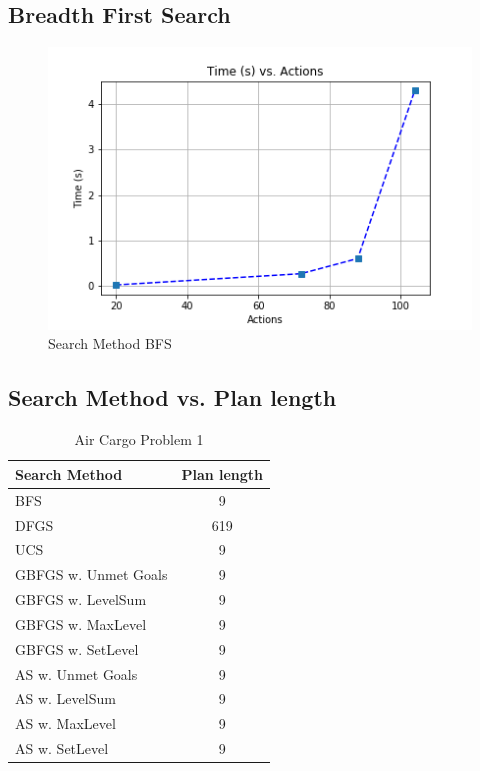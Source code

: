\documentclass[a4paper]{article}
\begin{document}
\subsection{Breadth First Search}

\begin{figure}[htpb]
\begin{center}
\includegraphics[width=0.5\columnwidth]{fig/results_1031.png}
\caption{Search Method BFS}
\end{center}
\label{fig1031}
\end{figure}

\subsection{Search Method vs. Plan length}

\begin{table}[htpb]
    \caption{ Air Cargo Problem 1 }
    \centering
    \begin{tabular}{ l | c }
    Search Method & Plan length \\ \hline 
BFS & 9 \\
DFGS & 619 \\
UCS & 9 \\
GBFGS w. Unmet Goals & 9 \\
GBFGS w. LevelSum & 9 \\
GBFGS w. MaxLevel & 9 \\
GBFGS w. SetLevel & 9 \\
AS w. Unmet Goals & 9 \\
AS w. LevelSum & 9 \\
AS w. MaxLevel & 9 \\
AS w. SetLevel & 9
\end{tabular}
    \label{airps1}
    \end{table}
\end{document}
